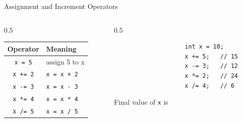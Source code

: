 \documentclass[aspectratio=169]{beamer}
\begin{document}
	\begin{frame}[fragile]{Assignment and Increment Operators}
		\begin{columns}[T]
			\begin{column}{0.5\textwidth}
				\renewcommand{\arraystretch}{1.25}
				\centering
				\begin{tabular}{@{}cl@{}}
					\toprule
					\textbf{Operator} & \textbf{Meaning} \\
					\midrule
					\texttt{x = 5}  & assign 5 to x \\
					\texttt{x += 2} & \texttt{x = x + 2} \\
					\texttt{x -= 3} & \texttt{x = x - 3} \\
					\texttt{x *= 4} & \texttt{x = x * 4} \\
					\texttt{x /= 5} & \texttt{x = x / 5} \\
					\bottomrule
				\end{tabular}
			\end{column}
			\begin{column}{0.5\textwidth}
				\begin{lstlisting}
					int x = 10;
					x += 5;   // 15
					x -= 3;   // 12
					x *= 2;   // 24
					x /= 4;   // 6
				\end{lstlisting}
				\centering\footnotesize Final value of \texttt{x} is 
			\end{column}
		\end{columns}
	\end{frame}
	
\end{document}
